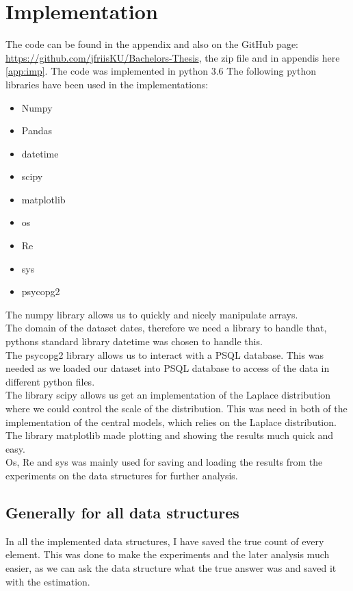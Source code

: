 \documentclass[11pt]{article}
\theoremstyle{definition}
\begin{document}
\section{Implementation}
The code can be found in the appendix and also on the GitHub page: \url{https://github.com/jfriisKU/Bachelors-Thesis}, the zip file and in appendis here \ref{app:imp}. The code was implemented in python 3.6
The following python libraries have been used in the implementations: 
\begin{multicols}{2}
\begin{itemize}
    \item Numpy
    \item Pandas
    \item datetime
    \item scipy
    \item matplotlib
    \item os
    \item Re
    \item sys
    \item psycopg2
\end{itemize}
\end{multicols}

The numpy library allows us to quickly and nicely manipulate arrays. \\ The domain of the dataset dates, therefore we need a library to handle that, pythons standard library datetime was chosen to handle this. \\ The psycopg2 library allows us to interact with a PSQL database. This was needed as we loaded our dataset into PSQL database to access of the data in different python files. \\ 
The library scipy allows us get an implementation of the Laplace distribution where we could control the scale of the distribution. This was need in both of the implementation of the central models, which relies on the Laplace distribution. \\
The library matplotlib made plotting and showing the results much quick and easy. \\
Os, Re and sys was mainly used for saving and loading the results from the experiments on the data structures for further analysis.

\subsection{Generally for all data structures}
In all the implemented data structures, I have saved the true count of every element. This was done to make the experiments and the later analysis much easier, as we can ask the data structure what the true answer was and saved it with the estimation. 
\end{document}
